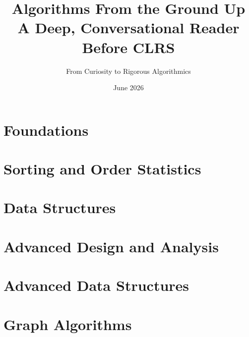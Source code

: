\documentclass[11pt]{book}
\title{\textbf{Algorithms From the Ground Up}\\[0.4em]\large A Deep, Conversational Reader Before CLRS}
\author{From Curiosity to Rigorous Algorithmics}
\date{June 2026}
\begin{document}
\frontmatter
\maketitle

\tableofcontents

\mainmatter

\part{Foundations}






\part{Sorting and Order Statistics}





\part{Data Structures}






\part{Advanced Design and Analysis}




\part{Advanced Data Structures}





\part{Graph Algorithms}





\end{document}
